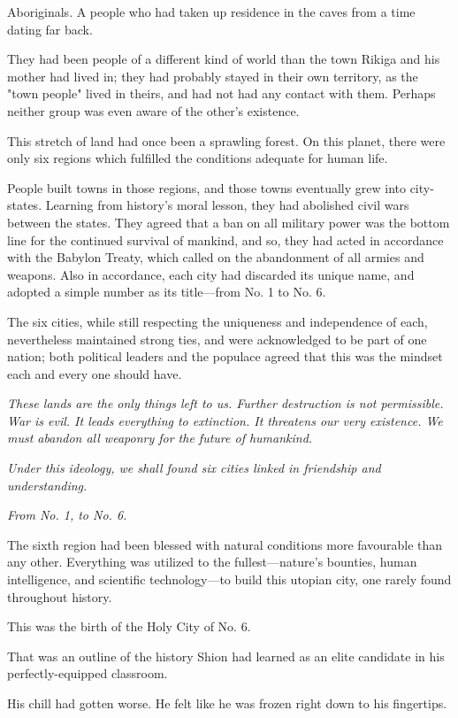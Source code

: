 Aboriginals. A people who had taken up residence in the caves from a
time dating far back.

They had been people of a different kind of world than the town Rikiga
and his mother had lived in; they had probably stayed in their own
territory, as the "town people" lived in theirs, and had not had any
contact with them. Perhaps neither group was even aware of the other's
existence.

This stretch of land had once been a sprawling forest. On this planet,
there were only six regions which fulfilled the conditions adequate for
human life.

People built towns in those regions, and those towns eventually grew
into city-states. Learning from history's moral lesson, they had
abolished civil wars between the states. They agreed that a ban on all
military power was the bottom line for the continued survival of
mankind, and so, they had acted in accordance with the Babylon Treaty,
which called on the abandonment of all armies and weapons. Also in
accordance, each city had discarded its unique name, and adopted a
simple number as its title---from No. 1 to No. 6.

The six cities, while still respecting the uniqueness and independence
of each, nevertheless maintained strong ties, and were acknowledged to
be part of one nation; both political leaders and the populace agreed
that this was the mindset each and every one should have.

\emph{These lands are the only things left to us. Further destruction is not
permissible. War is evil. It leads everything to extinction. It
threatens our very existence. We must abandon all weaponry for the
future of humankind.}

\emph{Under this ideology, we shall found six cities linked in friendship and
understanding.}

\emph{From No. 1, to No. 6.}

The sixth region had been blessed with natural conditions more
favourable than any other. Everything was utilized to the
fullest---nature's bounties, human intelligence, and scientific
technology---to build this utopian city, one rarely found throughout
history.

This was the birth of the Holy City of No. 6.

That was an outline of the history Shion had learned as an elite
candidate in his perfectly-equipped classroom.

His chill had gotten worse. He felt like he was frozen right down to his
fingertips.

